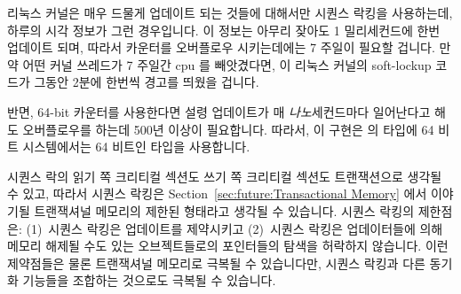 {	리눅스 커널은 매우 드물게 업데이트 되는 것들에 대해서만 시퀀스 락킹을
	사용하는데, 하루의 시각 정보가 그런 경우입니다.
	이 정보는 아무리 잦아도 1 밀리세컨드에 한번 업데이트 되며, 따라서
	카운터를 오버플로우 시키는데에는 7 주일이 필요할 겁니다.
	만약 어떤 커널 쓰레드가 7 주일간 cpu 를 빼앗겼다면, 이 리눅스 커널의
	soft-lockup 코드가 그동안 2분에 한번씩 경고를 띄웠을 겁니다.

	반면, 64-bit 카운터를 사용한다면 설령 업데이트가 매
	\emph{나노}세컨드마다 일어난다고 해도 오버플로우를 하는데 500년 이상이
	필요합니다.
	따라서, 이 구현은  의 타입에 64 비트 시스템에서는 64 비트인
	타입을 사용합니다.

} \QuickQuizEnd

시퀀스 락의 읽기 쪽 크리티컬 섹션도 쓰기 쪽 크리티컬 섹션도 트랜잭션으로 생각될
수 있고, 따라서 시퀀스 락킹은 Section~\ref{sec:future:Transactional Memory}
에서 이야기될 트랜잭셔널 메모리의 제한된 형태라고 생각될 수 있습니다.
시퀀스 락킹의 제한점은: (1)~시퀀스 락킹은 업데이트를 제약시키고 (2)~시퀀스
락킹은 업데이터들에 의해 메모리 해제될 수도 있는 오브젝트들로의 포인터들의
탐색을 허락하지 않습니다.
이런 제약점들은 물론 트랜잭셔널 메모리로 극복될 수 있습니다만, 시퀀스 락킹과
다른 동기화 기능들을 조합하는 것으로도 극복될 수 있습니다.

